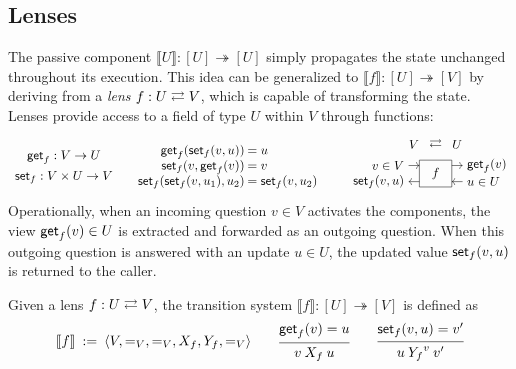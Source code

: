 \subsection{Lenses}
\label{sec:ox:lens}

The passive component $\llbracket U \rrbracket : [U] \twoheadrightarrow [U]$
simply propagates the state unchanged
throughout its execution.
This idea can be generalized to
$\llbracket f \rrbracket : [U] \twoheadrightarrow [V]$
by deriving from a \emph{lens} $f : U \rightleftarrows V$,
which is capable of transforming the state.
Lenses \citep{lenses} provide access to a field of type $U$ within $V$
through functions:
\[
  \begin{array}{c}
    \kw{get}_f : V \rightarrow U \\[1ex]
    \kw{set}_f : V \times U \rightarrow V
  \end{array}
  \quad
  \begin{array}{r@{\:}l}
    \kw{get}_f(\kw{set}_f(v, u)) &= u \\
    \kw{set}_f(v, \kw{get}_f(v)) &= v \\
    \kw{set}_f(\kw{set}_f(v, u_1), u_2) &= \kw{set}_f(v, u_2)
  \end{array}
  \qquad
  \begin{tikzpicture}[yscale=0.15,xscale=0.30,baseline=(V.base)]
    \draw (5,-1) rectangle (8,4) node[midway] {$f$};
    \draw[->] (4,3) node[left] (V) {$v \in V$} -- (5,3) node[above=1em,midway] (A2) {$V$};
    \draw[->] (8,3) -- (9,3) node[above=1em,midway] (A1) {$U$} node[right] {$\kw{get}_f(v)$};
    \draw[->] (9,0) node[right] {$u \in U$} -- (8,0);
    \draw[->] (5,0) -- (4,0) node[left] {$\kw{set}_f(v, u)$};
    \path (A1) -- node {$\rightleftarrows$} (A2);
  \end{tikzpicture}
\]
Operationally,
when an incoming question $v \in V$ activates the components,
the view $ \mathsf{get} _f(v) \in U$ is extracted and
forwarded as an outgoing question.
When this outgoing question is answered with an update $u \in U$,
the updated value $ \mathsf{set} _f(v, u)$ is returned to the caller.

\begin{definition}
  \label{ox:def:lts-lens}
  Given a lens $f : U \rightleftarrows V$,
  the transition system $\llbracket f \rrbracket : [U] \twoheadrightarrow [V]$
  is defined as
  \[
    \llbracket f \rrbracket \::=\:
    \langle
    V, =_V, =_V ,X_f, Y_f, =_V
    \rangle
    \qquad
    \begin{prooftree}
      \hypo{\kw{get}_f(v) = u}
      \infer1{v \mathbin{X_f} u}
    \end{prooftree}
    \qquad
    \begin{prooftree}
      \hypo{\kw{set}_f(v, u) = v'}
      \infer1{u \mathbin{Y_f}^v v'}
    \end{prooftree}
  \]
\end{definition}

